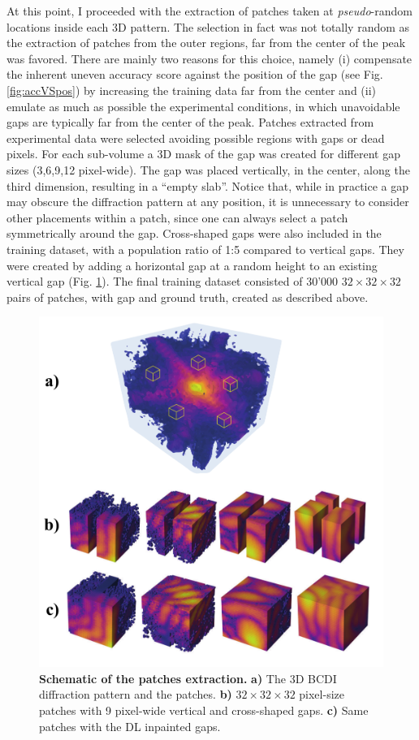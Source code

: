 At this point, I proceeded with the extraction of patches taken at \textit{pseudo}-random locations inside each 3D pattern. 
The selection in fact was not totally random as the extraction of patches from the outer regions, far from the 
center of the peak was favored. There are mainly two reasons for this choice, namely (i) compensate the inherent uneven accuracy score against
the position of the gap (see Fig.\ref{fig:accVSpos}) by increasing the training data far from the center and (ii) emulate
as much as possible the experimental conditions, in which unavoidable gaps are typically far from the center of the peak.
Patches extracted from experimental data were selected avoiding possible regions with gaps or dead pixels. 
For each sub-volume a 3D mask of the gap was created for different gap sizes (3,6,9,12 pixel-wide). The gap was placed 
vertically, in the center, along the third dimension, resulting in a ``empty slab''. Notice that, while in practice a 
gap may obscure the diffraction pattern at any position, it is unnecessary to consider other placements within a 
patch, since one can always select a patch symmetrically around the gap. Cross-shaped gaps were also 
included in the training dataset, with a population ratio of 1:5 compared to vertical gaps. They were created by 
adding a horizontal gap at a random height to an existing vertical gap (Fig. \ref{fig:patches_method}).
The final training dataset consisted of 30'000 $32\times32\times32$ pairs of patches, with gap and ground truth, 
created as described above. 

\begin{figure}[h]
    \centering
    \includegraphics[width=.6\textwidth]{figures/Inpainting/process.pdf}
    \caption{\textbf{Schematic of the patches extraction.} \textbf{a)} The 3D BCDI diffraction pattern and the 
    patches. \textbf{b)} $32\times32\times32$ pixel-size patches with 9 pixel-wide vertical and cross-shaped gaps.
    \textbf{c)} Same patches with the DL inpainted gaps.}
    \label{fig:patches_method}
\end{figure}

